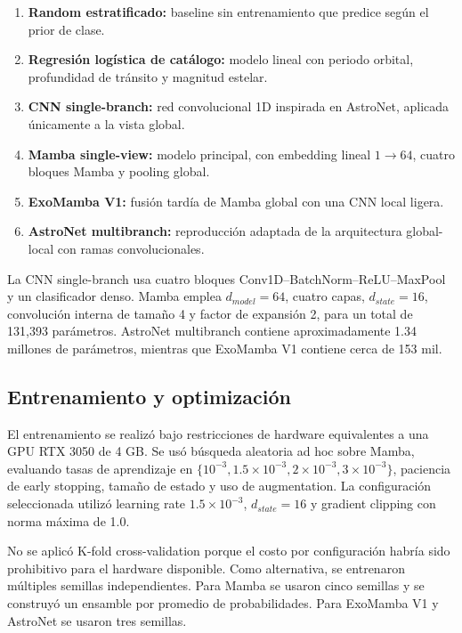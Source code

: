\documentclass[conference]{IEEEtran}
\begin{document}
\begin{enumerate}
    \item \textbf{Random estratificado:} baseline sin entrenamiento que predice según el prior de clase.
    \item \textbf{Regresión logística de catálogo:} modelo lineal con periodo orbital, profundidad de tránsito y magnitud estelar.
    \item \textbf{CNN single-branch:} red convolucional 1D inspirada en AstroNet, aplicada únicamente a la vista global.
    \item \textbf{Mamba single-view:} modelo principal, con embedding lineal $1\rightarrow64$, cuatro bloques Mamba y pooling global.
    \item \textbf{ExoMamba V1:} fusión tardía de Mamba global con una CNN local ligera.
    \item \textbf{AstroNet multibranch:} reproducción adaptada de la arquitectura global-local con ramas convolucionales.
\end{enumerate}

La CNN single-branch usa cuatro bloques Conv1D--BatchNorm--ReLU--MaxPool y un clasificador denso. Mamba emplea $d_{model}=64$, cuatro capas, $d_{state}=16$, convolución interna de tamaño 4 y factor de expansión 2, para un total de 131,393 parámetros. AstroNet multibranch contiene aproximadamente 1.34 millones de parámetros, mientras que ExoMamba V1 contiene cerca de 153 mil.

\subsection{Entrenamiento y optimización}

El entrenamiento se realizó bajo restricciones de hardware equivalentes a una GPU RTX 3050 de 4 GB. Se usó búsqueda aleatoria ad hoc sobre Mamba, evaluando tasas de aprendizaje en $\{10^{-3},1.5\times10^{-3},2\times10^{-3},3\times10^{-3}\}$, paciencia de early stopping, tamaño de estado y uso de augmentation. La configuración seleccionada utilizó learning rate $1.5\times10^{-3}$, $d_{state}=16$ y gradient clipping con norma máxima de 1.0.

No se aplicó K-fold cross-validation porque el costo por configuración habría sido prohibitivo para el hardware disponible. Como alternativa, se entrenaron múltiples semillas independientes. Para Mamba se usaron cinco semillas y se construyó un ensamble por promedio de probabilidades. Para ExoMamba V1 y AstroNet se usaron tres semillas.
\end{document}
